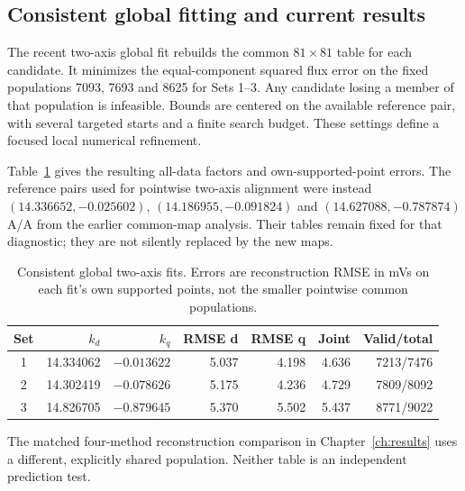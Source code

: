 \subsection{Consistent global fitting and current results}
The recent two-axis global fit rebuilds the common $81\times81$ table for each candidate. It minimizes the equal-component squared flux error on the fixed populations 7093, 7693 and 8625 for Sets 1--3. Any candidate losing a member of that population is infeasible. Bounds are centered on the available reference pair, with several targeted starts and a finite search budget. These settings define a focused local numerical refinement.

Table~\ref{tab:consistent-global} gives the resulting all-data factors and own-supported-point errors. The reference pairs used for pointwise two-axis alignment were instead $(14.336652,-0.025602)$, $(14.186955,-0.091824)$ and $(14.627088,-0.787874)$ A/A from the earlier common-map analysis. Their tables remain fixed for that diagnostic; they are not silently replaced by the new maps.
\begin{table}[htbp]\centering\small
\caption{Consistent global two-axis fits. Errors are reconstruction RMSE in mVs on each fit's own supported points, not the smaller pointwise common populations.}\label{tab:consistent-global}
\begin{tabular}{crrrrrr}
\toprule
Set & $k_d$ & $k_q$ & RMSE d & RMSE q & Joint & Valid/total\\
\midrule
1 & 14.334062 & $-0.013622$ & 5.037 & 4.198 & 4.636 & 7213/7476\\
2 & 14.302419 & $-0.078626$ & 5.175 & 4.236 & 4.729 & 7809/8092\\
3 & 14.826705 & $-0.879645$ & 5.370 & 5.502 & 5.437 & 8771/9022\\
\bottomrule
\end{tabular}
\end{table}
The matched four-method reconstruction comparison in Chapter~\ref{ch:results} uses a different, explicitly shared population. Neither table is an independent prediction test.

